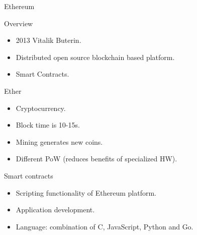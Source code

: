 \begin{frame}{Ethereum}
  \begin{block}{Overview}
    \begin{itemize}
      \item 2013 Vitalik Buterin.
      \item Distributed open source blockchain based platform.
      \item Smart Contracts.
    \end{itemize}
  \end{block}
  \begin{block}{Ether}
    \begin{itemize}
      \item Cryptocurrency.
      \item Block time is 10-15s. 
      \item Mining generates new coins. 
      \item Different PoW (reduces benefits of specialized HW).
    \end{itemize}
  \end{block}
  \begin{block}{Smart contracts}
    \begin{itemize}
      \item Scripting functionality of Ethereum platform.
      \item Application development. 
      \item Language: combination of C, JavaScript, Python and Go. 
    \end{itemize}
  \end{block}
\end{frame}

